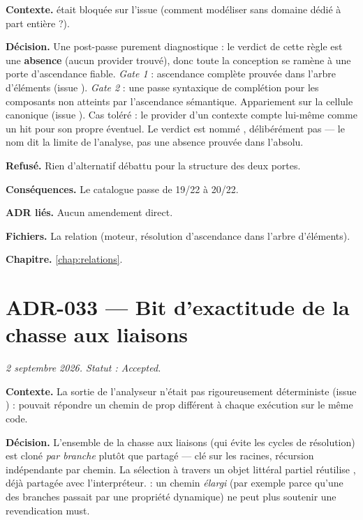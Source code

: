 \textbf{Contexte.}  était bloquée sur
l'issue  (comment modéliser  sans domaine dédié à
part entière ?).

\textbf{Décision.} Une post-passe purement diagnostique : le verdict de cette
règle est une \textbf{absence} (aucun provider trouvé), donc toute la
conception se ramène à une porte d'ascendance fiable. \emph{Gate 1} :
ascendance complète prouvée dans l'arbre d'éléments (issue ).
\emph{Gate 2} : une passe syntaxique de complétion pour les composants non
atteints par l'ascendance sémantique. Appariement sur la cellule canonique
 (issue ). Cas toléré : le provider d'un contexte
compte lui-même comme un \og hit\fg{} pour son propre 
éventuel. Le verdict est nommé , délibérément
pas  --- le nom dit la limite de l'analyse, pas une absence
prouvée dans l'absolu.

\textbf{Refusé.} Rien d'alternatif débattu pour la structure des deux portes.

\textbf{Conséquences.} Le catalogue passe de 19/22 à 20/22.

\textbf{ADR liés.} Aucun amendement direct.

\textbf{Fichiers.} La relation  (moteur, résolution
d'ascendance dans l'arbre d'éléments).

\textbf{Chapitre.} \cref{chap:relations}.

\section{ADR-033 --- Bit d'exactitude de la chasse aux liaisons}
\label{adr:33}
\noindent\textit{2 septembre 2026. Statut : Accepted.}

\textbf{Contexte.} La sortie de l'analyseur n'était pas rigoureusement
déterministe (issue ) :  pouvait répondre
un chemin de prop différent à chaque exécution sur le même code.

\textbf{Décision.} L'ensemble  de la chasse aux liaisons (qui évite
les cycles de résolution) est cloné \emph{par branche} plutôt que partagé ---
clé sur les racines, récursion indépendante par chemin. La sélection à
travers un objet littéral partiel réutilise ,
déjà partagée avec l'interpréteur.  : un
chemin \emph{élargi} (par exemple parce qu'une des branches passait par une
propriété dynamique) ne peut plus soutenir une revendication must.

